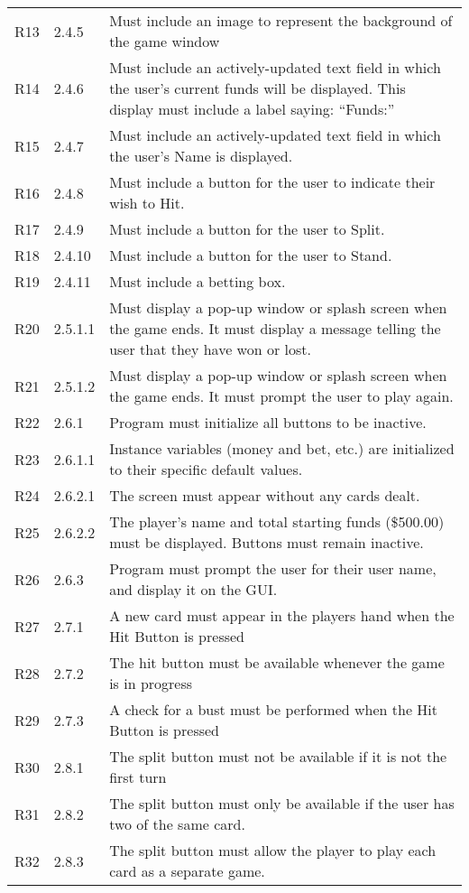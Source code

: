 \documentclass [landscape, 12pt] {article}
\begin{document}
\begin {longtable}{p{4cm}p{3cm}p{10cm}}
			R13 & 2.4.5 & Must include an image to represent the background of the game window\\
			R14 & 2.4.6 & Must include an actively-updated text field in which the user's current funds will be displayed.  This display must include a label saying: “Funds:”\\
			R15 & 2.4.7 & Must include an actively-updated text field in which the user's Name is displayed.\\
			R16 & 2.4.8 & Must include a button for the user to indicate their wish to Hit.\\
			R17 & 2.4.9 & Must include a button for the user to Split.\\
			R18 & 2.4.10 & Must include a button for the user to Stand.\\
			R19 & 2.4.11 & Must include a betting box.\\
			R20 & 2.5.1.1 & Must display a pop-up window or splash screen when the game ends. It must display a message telling the user that they have won or lost.\\
			R21 & 2.5.1.2 & Must display a pop-up window or splash screen when the game ends. It must prompt the user to play again.\\
			R22 & 2.6.1 & Program must initialize all buttons to be inactive.\\
			R23 & 2.6.1.1 & Instance variables (money and bet, etc.) are initialized to their specific default values.  \\
			R24 & 2.6.2.1 & The screen must appear without any cards dealt.\\
			R25 & 2.6.2.2 & The player's name and total starting funds (\$500.00) must be displayed.  Buttons must remain inactive.\\  
			R26 & 2.6.3 & Program must prompt the user for their user name, and display it on the GUI.  \\
			R27 & 2.7.1 & A new card must appear in the players hand when the Hit Button is pressed\\
			R28 & 2.7.2 & The hit button must be available whenever the game is in progress\\
			R29 & 2.7.3 & A check for a bust must be performed when the Hit Button is pressed\\
			R30 & 2.8.1 & The split button must not be available if it is not the first turn\\
			R31 & 2.8.2 & The split button must only be available if the user has two of the same card.\\
			R32 & 2.8.3 & The split button must allow the player to play each card as a separate game.\\

\end{longtable}
\end{document}
